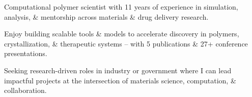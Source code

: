 \documentclass[letterpaper,12pt]{article}
\begin{document}
\begin{tabitemize}
  \item Computational polymer scientist with 11 years of experience in simulation, analysis, \& mentorship across materials \& drug delivery research.
  \item Enjoy building scalable tools \& models to accelerate discovery in polymers, crystallization, \& therapeutic systems -- with 5 publications \& 27+ conference presentations.
  \item Seeking research-driven roles in industry or government where I can lead impactful projects at the intersection of materials science, computation, \& collaboration.
\end{tabitemize}

\end{document}
